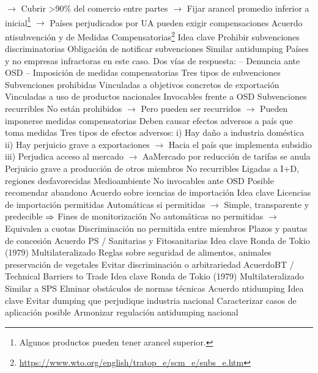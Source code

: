 \documentclass{nuevotema}
\begin{document}
\begin{esquemal}
				\4[] $\to$ Cubrir >90\% del comercio entre partes
				\4[] $\to$ Fijar arancel promedio inferior a inicial\footnote{Algunos productos pueden tener arancel superior.}
				\4[] $\to$ Países perjudicados por UA pueden exigir compensaciones
		\2 Acuerdo ntisubvención y de Medidas Compensatorias\footnote{\url{https://www.wto.org/english/tratop_e/scm_e/subs_e.htm}}
			\3 Idea clave
				\4 Prohibir subvenciones discriminatorias
				\4 Obligación de notificar subvenciones
				\4 Similar antidumping
				\4[] Países y no empresas infractoras en este caso.
				\4 Dos vías de respuesta:
				\4[] -- Denuncia ante OSD
				\4[] -- Imposición de medidas compensatorias
				\4 Tres tipos de subvenciones
			\3 Subvenciones prohibidas
				\4 Vinculadas a objetivos concretos de exportación
				\4 Vinculadas a uso de productos nacionales
				\4 Invocables frente a OSD
			\3 Subvenciones recurribles
				\4 No están prohibidos
				\4[] $\to$ Pero pueden ser recurridos
				\4[] $\to$ Pueden imponerse medidas compensatorias
				\4 Deben causar efectos adversos a país que toma medidas
				\4[] Tres tipos de efectos adversos:
				\4[] i) Hay daño a industria doméstica
				\4[] ii) Hay perjuicio grave a exportaciones
				\4[] $\to$ Hacia el país que implementa subsidio
				\4[] iii) Perjudica acceso al mercado
				\4[] $\to$ AaMercado por reducción de tarifas se anula
				\4 Perjuicio grave a producción de otros miembros
			\3 No recurribles
				\4 Ligadas a I+D, regiones desfavorecidas
				\4 Medioambiente
				\4 No invocables ante OSD
				\4 Posible recomendar abandono
		\2 Acuerdo sobre icencias de importación
			\3 Idea clave
				\4 Licencias de importación permitidas
				\4[] Automáticas si permitidas
				\4[] $\to$ Simple, transparente y predecible
				\4[] $\Rightarrow$ Fines de monitorización
				\4[] No automáticas no permitidas
				\4[] $\to$ Equivalen a cuotas
				\4 Discriminación no permitida entre miembros
				\4 Plazos y pautas de concesión
		\2 Acuerdo PS / Sanitarias y Fitosanitarias
			\3 Idea clave
				\4 Ronda de Tokio (1979)
				\4[] Multilateralizado
				\4 Reglas sobre seguridad de alimentos, animales
				\4[] preservación de vegetales
				\4 Evitar discriminación o arbitrariedad
		\2 AcuerdoBT / Technical Barriers to Trade
			\3 Idea clave
				\4 Ronda de Tokio (1979)
				\4[] Multilateralizado
				\4 Similar a SPS
				\4 Elminar obstáculos de normas técnicas
		\2 Acuerdo ntidumping
			\3 Idea clave
				\4 Evitar dumping que perjudique industria nacional
				\4 Caracterizar casos de aplicación posible
				\4 Armonizar regulación antidumping nacional

\end{esquemal}
\end{document}
